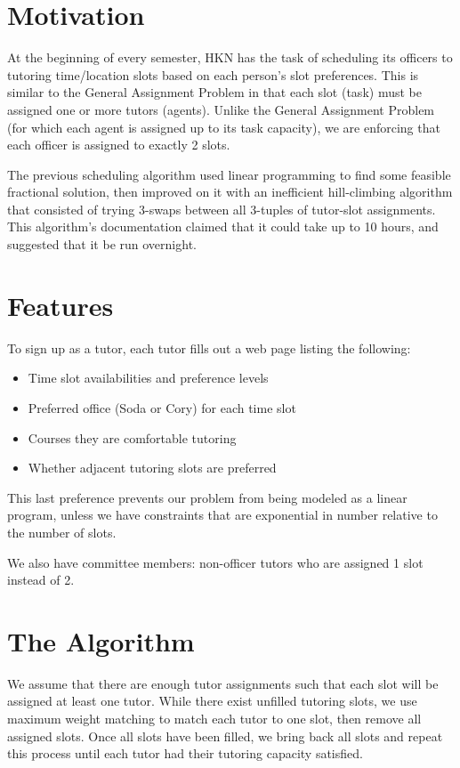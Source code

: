\documentclass{vldb}
\begin{document}


\maketitle


\section{Motivation}
At the beginning of every semester, HKN has the task of scheduling its officers to tutoring time/location slots based on each person's slot preferences. This is similar to the General Assignment Problem in that each slot (task) must be assigned one or more tutors (agents). Unlike the General Assignment Problem (for which each agent is assigned up to its task capacity), we are enforcing that each officer is assigned to exactly 2 slots.

The previous scheduling algorithm used linear programming to find some feasible fractional solution, then improved on it with an inefficient hill-climbing algorithm that consisted of trying 3-swaps between all 3-tuples of tutor-slot assignments. This algorithm's documentation claimed that it could take up to 10 hours, and suggested that it be run overnight.

\section{Features}
To sign up as a tutor, each tutor fills out a web page listing the following:
\begin{itemize}
\item Time slot availabilities and preference levels
\item Preferred office (Soda or Cory) for each time slot
\item Courses they are comfortable tutoring
\item Whether adjacent tutoring slots are preferred
\end{itemize}
This last preference prevents our problem from being modeled as a linear program, unless we have constraints that are exponential in number relative to the number of slots.

We also have committee members: non-officer tutors who are assigned 1 slot instead of 2.

\section{The Algorithm}
We assume that there are enough tutor assignments such that each slot will be assigned at least one tutor. While there exist unfilled tutoring slots, we use maximum weight matching to match each tutor to one slot, then remove all assigned slots. Once all slots have been filled, we bring back all slots and repeat this process until each tutor had their tutoring capacity satisfied.
\end{document}
